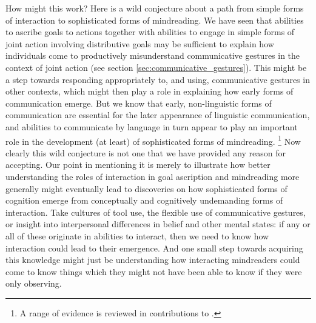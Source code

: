\documentclass[12pt,\papersize]{extarticle}
\begin{document}
How might this work?
Here is a wild conjecture about
a path from simple forms of interaction to sophisticated forms of mindreading.
We have seen that 
	abilities to ascribe goals to actions 
 together with
	abilities to engage in simple forms of joint action involving distributive goals
 may be sufficient to explain how individuals come to productively misunderstand communicative gestures in the context of joint action (see section \vref{sec:communicative_gestures}).
This might  be a step towards responding appropriately to, and using, communicative gestures in other contexts,
which might then play a role in explaining how early forms of communication emerge.
But we know that early, non-linguistic forms of communication are essential for the later appearance of linguistic communication,
and abilities to communicate by language in turn appear to play an important role in the development (at least) of sophisticated forms of mindreading.%
\footnote{
A range of evidence is reviewed in contributions to \citet{Astington2005ot}.
}
Now clearly this wild conjecture is not one that we have provided any reason for accepting.
Our point in mentioning it is merely to illustrate how
 better understanding the roles of interaction in goal ascription and  mindreading more generally
might eventually lead to discoveries
on how
 sophisticated forms of cognition
 emerge from
 conceptually and cognitively undemanding forms of interaction.
Take cultures of tool use,
	the flexible use of communicative gestures,
	or insight into interpersonal differences in belief and other mental states:
if any or all of these 
originate in abilities to interact,
then we need to know how interaction could lead to their emergence.
And one small step towards acquiring this knowledge might just be 
understanding how interacting mindreaders 
could 
	come to know things 
which they might not have been able to know 
if they were only observing.



\end{document}
